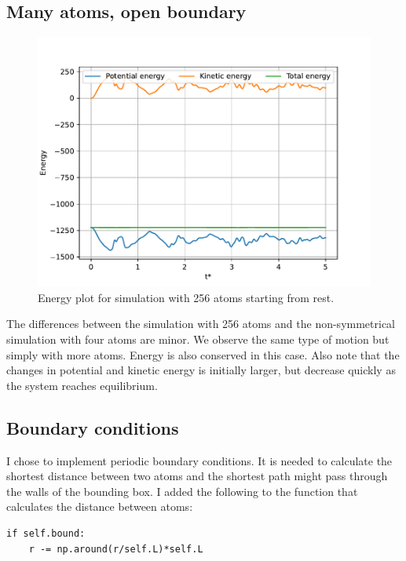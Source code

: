 \documentclass[a4paper,10pt,english]{article}
\begin{document}
\newpage

\subsection{Many atoms, open boundary} \label{3d}

\begin{figure}[h!]
    \centering
    \includegraphics[scale=0.65]{../figures/3_d.pdf}
    \caption{Energy plot for simulation with 256 atoms starting from rest.}
    \label{fig:energyplots4}
\end{figure}

The differences between the simulation with 256 atoms and the non-symmetrical simulation with four atoms are minor. We observe the same type of motion but simply with more atoms. Energy is also conserved in this case. Also note that the changes in potential and kinetic energy is initially larger, but decrease quickly as the system reaches equilibrium.

\subsection{Boundary conditions} \label{3e}

I chose to implement periodic boundary conditions. It is needed to calculate the shortest distance between two atoms and the shortest path might pass through the walls of the bounding box. I added the following to the function that calculates the distance between atoms:
\begin{lstlisting}
if self.bound:
    r -= np.around(r/self.L)*self.L
\end{lstlisting}
\end{document}
